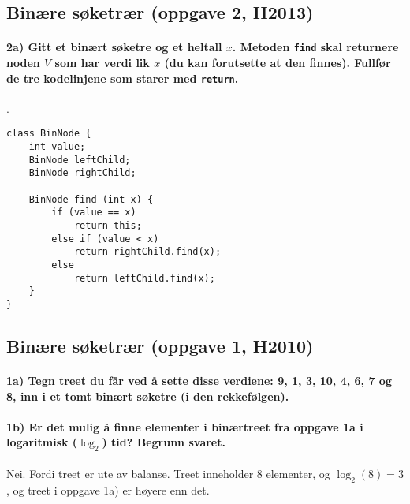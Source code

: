 \documentclass[11pt,a4paper]{article}
\theoremstyle{def}
\begin{document}
\subsection{Binære søketrær (oppgave 2, H2013)}
\paragraph{2a) Gitt et binært søketre og et heltall $x$. Metoden \texttt{find} skal returnere noden $V$ som har verdi lik $x$ (du kan forutsette at den finnes). Fullfør de tre kodelinjene som starer med \texttt{return}.}.

\begin{lstlisting}[frame=none]
class BinNode {
	int value;
	BinNode leftChild;
	BinNode rightChild;

	BinNode find (int x) {
		if (value == x) 
			return this;
		else if (value < x)
			return rightChild.find(x);
		else
			return leftChild.find(x);
	}
}
\end{lstlisting}

\newpage

\subsection{Binære søketrær (oppgave 1, H2010)}

\paragraph{1a) Tegn treet du får ved å sette disse verdiene: 9, 1, 3, 10, 4, 6, 7 og 8, inn i et tomt binært søketre (i den rekkefølgen).}

\begin{center}
\end{center}

\paragraph{1b) Er det mulig å finne elementer i binærtreet fra oppgave 1a i logaritmisk ($\log_2$) tid? Begrunn svaret.}
Nei. Fordi treet er ute av balanse. Treet inneholder 8 elementer, og $\log_2(8)=3$, og treet i oppgave 1a) er høyere enn det.
\end{document}
